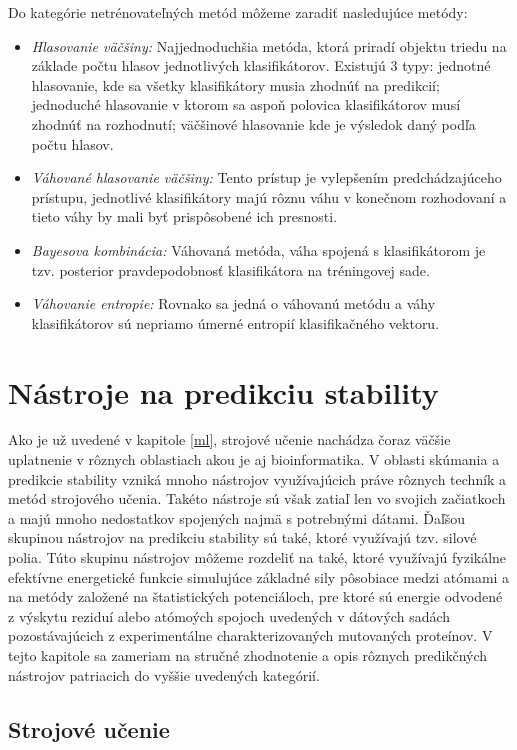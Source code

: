 Do kategórie netrénovateľných metód môžeme zaradiť nasledujúce metódy:
\begin{itemize}
	\item \textit{Hlasovanie väčšiny:} Najjednoduchšia metóda, ktorá priradí objektu triedu na základe počtu hlasov jednotlivých klasifikátorov. Existujú 3 typy: jednotné hlasovanie, kde sa všetky klasifikátory musia zhodnúť na predikcií; jednoduché hlasovanie v ktorom sa aspoň polovica klasifikátorov musí zhodnúť na rozhodnutí; väčšinové hlasovanie kde je výsledok daný podľa počtu hlasov.
	\item \textit{Váhované hlasovanie väčšiny:} Tento prístup je vylepšením predchádzajúceho prístupu, jednotlivé klasifikátory majú rôznu váhu v konečnom rozhodovaní a tieto váhy by mali byť prispôsobené ich presnosti.
	\item \textit{Bayesova kombinácia:} Váhovaná metóda, váha spojená s klasifikátorom je tzv. posterior pravdepodobnosť klasifikátora na tréningovej sade.
	\item \textit{Váhovanie entropie:} Rovnako sa jedná o váhovanú metódu a váhy klasifikátorov sú nepriamo úmerné entropií klasifikačného vektoru.
\end{itemize}


\chapter{Nástroje na predikciu stability}

Ako je už uvedené v kapitole \ref{ml}, strojové učenie nachádza čoraz väčšie uplatnenie v rôznych oblastiach akou je aj bioinformatika. V oblasti skúmania a predikcie stability vzniká mnoho nástrojov využívajúcich práve rôznych techník a metód strojového učenia. Takéto nástroje sú však zatiaľ len vo svojich začiatkoch a majú mnoho nedostatkov spojených najmä s potrebnými dátami. Ďaľšou skupinou nástrojov na predikciu stability sú také, ktoré využívajú tzv. silové polia. Túto skupinu nástrojov môžeme rozdeliť na také, ktoré využívajú fyzikálne efektívne energetické funkcie simulujúce základné sily pôsobiace medzi atómami a na metódy založené na štatistických potenciáloch, pre ktoré sú energie odvodené z výskytu reziduí alebo atómoých spojoch uvedených v dátových sadách pozostávajúcich z experimentálne charakterizovaných mutovaných proteínov.
V tejto kapitole sa zameriam na stručné zhodnotenie a opis rôznych predikčných nástrojov patriacich do vyššie uvedených kategórií.

\section{Strojové učenie}

